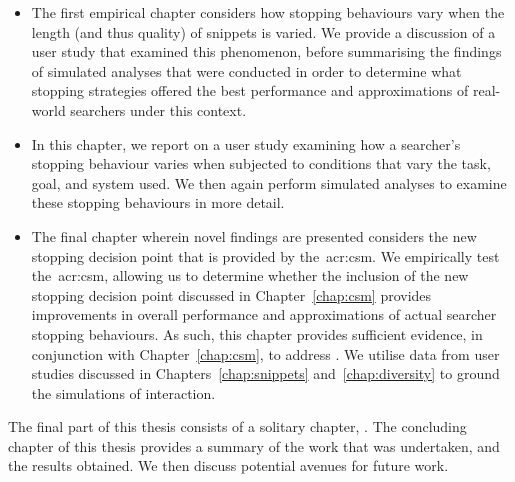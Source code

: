 \begin{itemize}
    \item[]{ The first empirical chapter considers how stopping behaviours vary when the length (and thus quality) of snippets is varied. We provide a discussion of a user study that examined this phenomenon, before summarising the findings of simulated analyses that were conducted in order to determine what stopping strategies offered the best performance and approximations of real-world searchers under this context.}
    
    \item[]{ In this chapter, we report on a user study examining how a searcher's stopping behaviour varies when subjected to conditions that vary the task, goal, and system used. We then again perform simulated analyses to examine these stopping behaviours in more detail.}
    
    \item[]{ The final chapter wherein novel findings are presented considers the new stopping decision point that is provided by the~\gls{acr:csm}. We empirically test the~\gls{acr:csm}, allowing us to determine whether the inclusion of the new stopping decision point discussed in Chapter~\ref{chap:csm} provides improvements in overall performance and approximations of actual searcher stopping behaviours. As such, this chapter provides sufficient evidence, in conjunction with Chapter~\ref{chap:csm}, to address . We utilise data from user studies discussed in Chapters~\ref{chap:snippets} and~\ref{chap:diversity} to ground the simulations of interaction.}
\end{itemize}

\noindent
{} The final part of this thesis consists of a solitary chapter, . The concluding chapter of this thesis provides a summary of the work that was undertaken, and the results obtained. We then discuss potential avenues for future work.